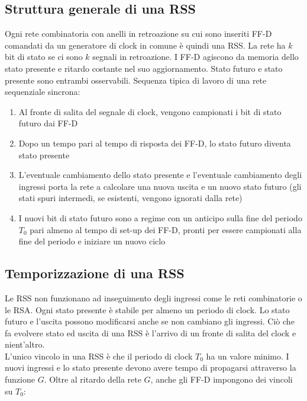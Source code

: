 \documentclass{subfiles}
\begin{document}
\subsection{Struttura generale di una RSS}

Ogni rete combinatoria con anelli in retroazione su cui sono inseriti FF-D comandati da un generatore di clock in comune è quindi una RSS.
La rete ha $k$ bit di stato se ci sono $k$ segnali in retroazione.
I FF-D agiscono da memoria dello stato presente e ritardo costante nel suo aggiornamento.
Stato futuro e stato presente sono entrambi osservabili.
Sequenza tipica di lavoro di una rete sequenziale sincrona:

\begin{enumerate}
    \item Al fronte di salita del segnale di clock, vengono campionati i bit di stato futuro dai FF-D
    \item Dopo un tempo pari al tempo di risposta dei FF-D, lo stato futuro diventa stato presente
    \item L'eventuale cambiamento dello stato presente e l'eventuale cambiamento degli ingressi porta la rete a calcolare una nuova uscita e un nuovo stato futuro (gli stati spuri intermedi, se esistenti, vengono ignorati dalla rete)
    \item I nuovi bit di stato futuro sono a regime con un anticipo sulla fine del periodo $T_0$ pari almeno al tempo di set-up dei FF-D, pronti per essere campionati alla fine del periodo e iniziare un nuovo ciclo
\end{enumerate}

\subsection{Temporizzazione di una RSS}

Le RSS non funzionano ad inseguimento degli ingressi come le reti combinatorie o le RSA.
Ogni stato presente è stabile per almeno un periodo di clock.
Lo stato futuro e l'uscita possono modificarsi anche se non cambiano gli ingressi.
Ciò che fa evolvere stato ed uscita di una RSS è l'arrivo di un fronte di salita del clock e nient'altro.\\

\noindent
L'unico vincolo in una RSS è che il periodo di clock $T_0$ ha un valore minimo.
I nuovi ingressi e lo stato presente devono avere tempo di propagarsi attraverso la funzione $G$.
Oltre al ritardo della rete $G$, anche gli FF-D impongono dei vincoli su $T_0$:
\end{document}
